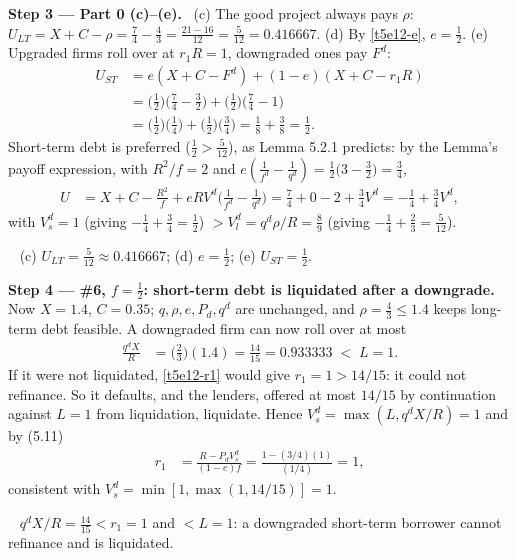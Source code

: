 \documentclass[11pt,a4paper]{article}
\newcommand{\step}[2]{\par\medskip\noindent\textbf{Step #1 --- #2.}~}
\newcommand{\answer}[1]{\par\smallskip\noindent\fbox{\textbf{Answer #1.}}~}
\begin{document}
\step{3}{Part 0 (c)--(e)} (c) The good project always pays $\rho$:
$U_{LT}=X+C-\rho=\frac74-\frac43=\frac{21-16}{12}=\frac5{12}=0.416667$. (d) By \eqref{t5e12-e}, $e=\frac12$.
(e) Upgraded firms roll over at $r_1R=1$, downgraded ones pay $F^d$:
\begin{align}
  U_{ST} &= e(X+C-F^d)+(1-e)(X+C-r_1R) \nonumber\\
         &= \big(\tfrac12\big)\big(\tfrac74-\tfrac32\big)+\big(\tfrac12\big)\big(\tfrac74-1\big) \nonumber\\
         &= \big(\tfrac12\big)\big(\tfrac14\big)+\big(\tfrac12\big)\big(\tfrac34\big) = \tfrac18+\tfrac38 = \tfrac12. \label{t5e12-UST0}
\end{align}
Short-term debt is preferred ($\frac12>\frac5{12}$), as Lemma 5.2.1 predicts: by the Lemma's payoff expression,
with $R^2/f=2$ and $e(\frac1{f^d}-\frac1{q^d})=\frac12\bigl(3-\frac32\bigr)=\frac34$,
\begin{align}
  U &= X+C-\frac{R^2}{f}+eRV^d\Big(\frac1{f^d}-\frac1{q^d}\Big) = \tfrac74+0-2+\tfrac34V^d = -\tfrac14+\tfrac34V^d, \label{t5e12-lemma1}
\end{align}
with $V_s^d=1$ (giving $-\frac14+\frac34=\frac12$) $>V_l^d=q^d\rho/R=\frac89$ (giving $-\frac14+\frac23=\frac5{12}$).

\answer{0(c)--(e)} (c) $U_{LT}=\tfrac5{12}\approx0.416667$; (d) $e=\tfrac12$; (e) $U_{ST}=\tfrac12$.

\step{4}{\#6, $f=\frac12$: short-term debt is liquidated after a downgrade} Now $X=1.4$, $C=0.35$; $q,\rho,e,P_d,q^d$ are unchanged, and
$\rho=\frac43\le1.4$ keeps long-term debt feasible. A downgraded firm can now roll over at most
\begin{align}
  \frac{q^dX}{R} &= \big(\tfrac23\big)(1.4) = \tfrac{14}{15} = 0.933333 \;<\; L=1. \label{t5e12-roll}
\end{align}
If it were not liquidated, \eqref{t5e12-r1} would give $r_1=1>14/15$: it could not refinance. So it defaults, and the lenders, offered at
most $14/15$ by continuation against $L=1$ from liquidation, liquidate. Hence $V_s^d=\max(L,q^dX/R)=1$ and by (5.11)
\begin{align}
  r_1 &= \frac{R-P_dV_s^d}{(1-e)f} = \frac{1-(3/4)(1)}{(1/4)} = 1, \label{t5e12-r1b}
\end{align}
consistent with $V_s^d=\min[1,\max(1,14/15)]=1$.

\answer{(i)} $q^dX/R=\tfrac{14}{15}<r_1=1$ and $<L=1$: a downgraded short-term borrower cannot refinance
and is liquidated.
\end{document}
